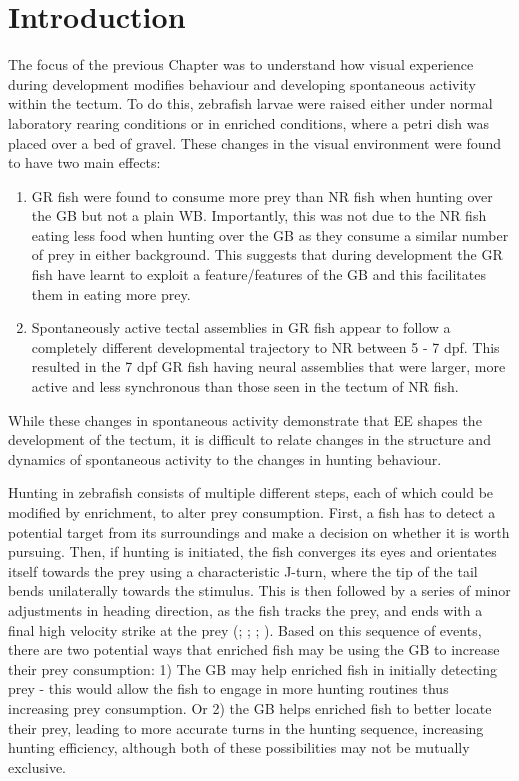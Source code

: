\section{Introduction}
The focus of the previous Chapter was to understand how visual experience during development modifies behaviour and developing spontaneous activity within the tectum. To do this, zebrafish larvae were raised either under normal laboratory rearing conditions or in enriched conditions, where a petri dish was placed over a bed of gravel. These changes in the visual environment were found to have two main effects: 

\begin{enumerate}
    \item  GR fish were found to consume more prey than NR fish when hunting over the GB but not a plain WB. Importantly, this was not due to the NR fish eating less food when hunting over the GB as they consume a similar number of prey in either background. This suggests that during development the GR fish have learnt to exploit a feature/features of the GB and this facilitates them in eating more prey. 
    \item Spontaneously active tectal assemblies in GR fish appear to follow a completely different developmental trajectory to NR between 5 - 7 \gls{dpf}. This resulted in the 7 \gls{dpf} GR fish having neural assemblies that were larger, more active and less synchronous than those seen in the tectum of NR fish. 
\end{enumerate}

While these changes in spontaneous activity demonstrate that EE shapes the development of the tectum, it is difficult to relate changes in the structure and dynamics of spontaneous activity to the changes in hunting behaviour.

Hunting in zebrafish consists of multiple different steps, each of which could be modified by enrichment, to alter prey consumption. First, a fish has to detect a potential target from its surroundings and make a decision on whether it is worth pursuing. Then, if hunting is initiated, the fish converges its eyes and orientates itself towards the prey using a characteristic J-turn, where the tip of the tail bends unilaterally towards the stimulus. This is then followed by a series of minor adjustments in heading direction, as the fish tracks the prey, and ends with a final high velocity strike at the prey (\cite{Budick2000LocomotorCapture}; \cite{Gahtan2005}; \cite{Patterson2013}; \cite{McElligott2005PreyControl}). Based on this sequence of events, there are two potential ways that enriched fish may be using the GB to increase their prey consumption: 1) The GB may help enriched fish in initially detecting prey -  this would allow the fish to engage in more hunting routines thus increasing prey consumption. Or 2) the GB helps enriched fish to better locate their prey, leading to more accurate turns in the hunting sequence, increasing hunting efficiency, although both of these possibilities may not be mutually exclusive.

